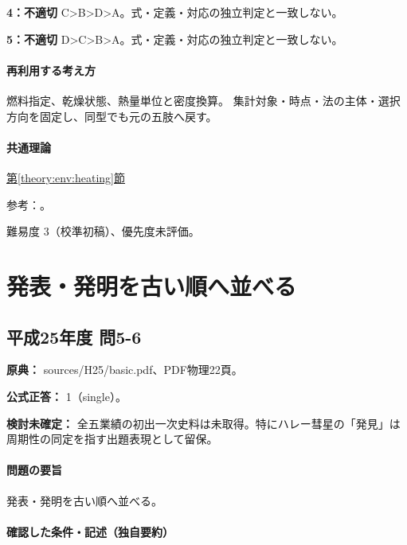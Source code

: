 \noindent\textbf{4：不適切} C>B>D>A。式・定義・対応の独立判定と一致しない。\par

\noindent\textbf{5：不適切} D>C>B>A。式・定義・対応の独立判定と一致しない。\par

\paragraph{再利用する考え方} 燃料指定、乾燥状態、熱量単位と密度換算。 集計対象・時点・法の主体・選択方向を固定し、同型でも元の五肢へ戻す。

\paragraph{共通理論} \hyperref[theory:env:heating]{第\ref*{theory:env:heating}節}

\par 参考：\cite{env58_heating}。

\par 難易度 3（校準初稿）、優先度未評価。

\section{発表・発明を古い順へ並べる}

\subsection{平成25年度 問5-6}
\label{q:h25-reg-basic-5-6}

\noindent\textbf{原典：} sources/H25/basic.pdf、PDF物理22頁。

\textbf{公式正答：} 1（single）。

\par\textbf{検討未確定：} 全五業績の初出一次史料は未取得。特にハレー彗星の「発見」は周期性の同定を指す出題表現として留保。

\paragraph{問題の要旨} 発表・発明を古い順へ並べる。

\paragraph{確認した条件・記述（独自要約）}\mbox{}\par

